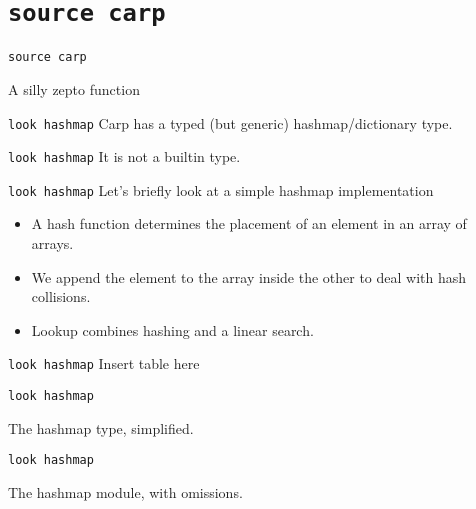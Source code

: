 \documentclass{beamer}
\begin{document}
  \section{\texttt{source carp}}
  \begin{frame}{\texttt{source carp}}
    \begin{listing}[H]
      \caption{A silly zepto function}
    \end{listing}
  \end{frame}
  \begin{frame}{\texttt{look hashmap}}
      Carp has a typed (but generic) hashmap/dictionary type.
  \end{frame}
  \begin{frame}{\texttt{look hashmap}}
      It is not a builtin type.
  \end{frame}
  \begin{frame}{\texttt{look hashmap}}
      Let’s briefly look at a simple hashmap implementation
      \begin{itemize}
        \item A hash function determines the placement of an element in an array of arrays.
        \item We append the element to the array inside the other to deal with hash collisions.
        \item Lookup combines hashing and a linear search.
      \end{itemize}
  \end{frame}
  \begin{frame}{\texttt{look hashmap}}
    Insert table here
  \end{frame}
  \begin{frame}{\texttt{look hashmap}}
    \begin{listing}[H]
      \caption{The hashmap type, simplified.}
    \end{listing}
  \end{frame}
  \begin{frame}{\texttt{look hashmap}}
    \begin{listing}[H]
      \caption{The hashmap module, with omissions.}
    \end{listing}
  \end{frame}
\end{document}
